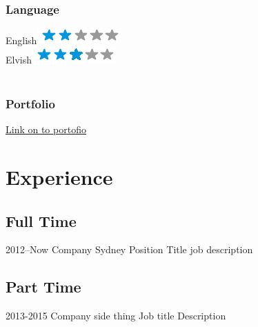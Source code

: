 \documentclass[]{friggeri-cv} %
\begin{document}
{\subsubsection{Language}
English\includegraphics[scale=0.3]{img/2stars.png} \\
Elvish\includegraphics[scale=0.3]{img/3stars.png} \\
~ \\
\subsubsection{Portfolio}
\textbf{\faUser} \href{http://www.yoursite.com/portfolio}{Link on to portofio}
} 



\section{Experience}
 
\subsection{Full Time}

\begin{entrylist}


\entry 
{2012--Now}
{Company}
{Sydney}%
{Position Title}
{
job description
}


\end{entrylist}

\subsection{Part Time}

\begin{entrylist}


\entry
{2013-2015}
{Company} 
{side thing}
{Job title}
{ 
Description
}




\end{entrylist}
\end{document}
